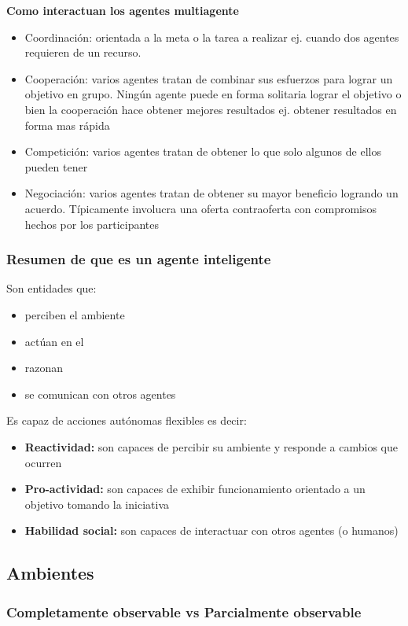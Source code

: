 \textbf{Como interactuan los agentes multiagente}
\begin{itemize}
  \item Coordinación: orientada a la meta o la tarea a realizar ej. cuando dos agentes requieren de un recurso.
  \item Cooperación: varios agentes tratan de combinar sus esfuerzos para lograr un objetivo en grupo. Ningún agente puede en forma solitaria lograr el objetivo o bien la cooperación hace obtener mejores resultados ej. obtener resultados en forma mas rápida
  \item Competición: varios agentes tratan de obtener lo que solo algunos de ellos pueden tener
  \item Negociación: varios agentes tratan de obtener su mayor beneficio logrando un acuerdo. Típicamente involucra una oferta contraoferta con compromisos hechos por los participantes 
\end{itemize}

\subsubsection*{Resumen de que es un agente inteligente}
Son entidades que:
\begin{itemize}
  \item perciben el ambiente
  \item actúan en el
  \item razonan
  \item se comunican con otros agentes
\end{itemize}
Es capaz de acciones autónomas flexibles es decir:
\begin{itemize}
  \item \textbf{Reactividad: }son capaces de percibir su ambiente y responde a cambios que ocurren
  \item \textbf{Pro-actividad: }son capaces de exhibir funcionamiento orientado a un objetivo tomando la iniciativa
  \item \textbf{Habilidad social: }son capaces de interactuar con otros agentes (o humanos)
\end{itemize}

\subsection*{Ambientes}
\subsubsection*{Completamente observable vs Parcialmente observable}

